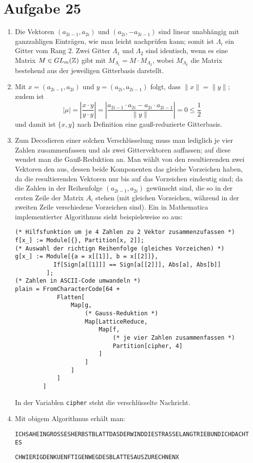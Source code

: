 \section*{Aufgabe 25}
\begin{enumerate}[(1)]
	\item Die Vektoren $(a_{2 i - 1}, a_{2 i})$ und $(a_{2 i},-a_{2 i -
	1})$ sind linear unabhängig mit ganzzahligen Einträgen, wie man leicht
	nachprüfen kann; somit ist $\Lambda_i$ ein Gitter vom Rang $2$. Zwei
	Gitter $\Lambda_1$ und $\Lambda_2$ sind identisch, wenn es eine Matrix
	$M \in GL_m(\mathbb{Z})$ gibt mit $M_{\Lambda_1} = M \cdot M_{\Lambda_2}$, wobei
	$M_{\Lambda_k}$ die Matrix bestehend aus der jeweiligen Gitterbasis
	darstellt.
	\item Mit $x = (a_{2 i - 1}, a_{2 i})$ und $y = (a_{2 i}, a_{2 i - 1})$
	folgt, dass $\|x\| = \|y\|$; zudem ist 
	\[ |\mu| = \left| \frac{x \cdot y}{y \cdot y} \right| 
	= \left| \frac{a_{2 i - 1}\cdot a_{2 i} -  a_{2 i}\cdot a_{2 i - 1} }{\|y\|} \right|
	= 0 \leq \frac{1}{2} \] 
	und damit ist $\{x,y\}$ nach Definition eine
	gauß-reduzierte Gitterbasis.
	\item Zum Decodieren einer solchen Verschlüsselung muss man lediglich
	je vier Zahlen zusammenfassen und als zwei Gittervektoren auffassen;
	auf diese wendet man die Gauß-Reduktion an. Man wählt von den
	resultierenden zwei Vektoren den aus, dessen beide Komponenten das
	gleiche Vorzeichen haben, da die resultierenden Vektoren nur bis auf
	das Vorzeichen eindeutig sind; da die Zahlen in der Reihenfolge
	$(a_{2i-1}, a_{2i})$ gewünscht sind, die so in der  ersten Zeile der
	Matrix $A_i$ stehen (mit gleichen Vorzeichen, während in der zweiten Zeile
	verschiedene Vorzeichen sind).  Ein in Mathematica implementierter
	Algorithmus sieht beispielsweise so aus:
\begin{lstlisting}
(* Hilfsfunktion um je 4 Zahlen zu 2 Vektor zusammenzufassen *)
f[x_] := Module[{}, Partition[x, 2]];
(* Auswahl der richtign Reihenfolge (gleiches Vorzeichen) *)
g[x_] := Module[{a = x[[1]], b = x[[2]]}, 
           If[Sign[a[[1]]] == Sign[a[[2]]], Abs[a], Abs[b]]
         ];
(* Zahlen in ASCII-Code umwandeln *)
plain = FromCharacterCode[64 +
            Flatten[
                Map[g, 
                    (* Gauss-Reduktion *)
                    Map[LatticeReduce, 
                        Map[f,
                            (* je vier Zahlen zusammenfassen *)
                            Partition[cipher, 4]
                        ]
                    ]
                ]
            ]
        ]
\end{lstlisting}
	In der Variablen \verb/cipher/ steht die verschlüsselte Nachricht.
	\item Mit obigem Algorithmus erhält man:

	\verb/ICHSAHEINGROSSESHERBSTBLATTDASDERWINDDIESTRASSELANGTRIEBUNDICHDACHTES/

	\verb/CHWIERIGDENKUENFTIGENWEGDESBLATTESAUSZURECHNENX/
\end{enumerate}
